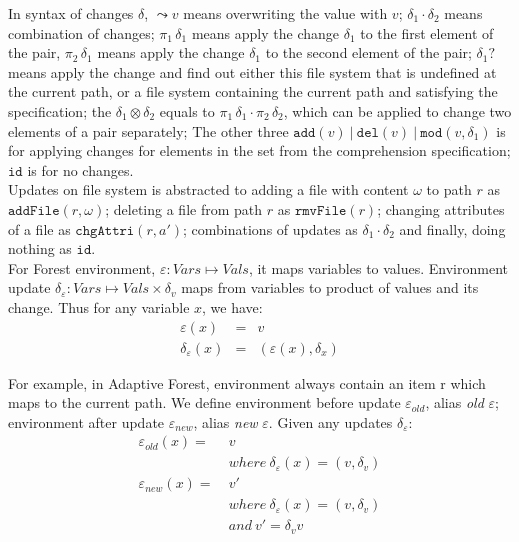 \documentclass[10pt,twoside,a4paper]{article}
\theoremstyle{theorem}
\theoremstyle{lemma}
\theoremstyle{property}
\theoremstyle{definition}
\theoremstyle{assumption}
\def\fst{\pi_1}
\def\snd{\pi_2}
\begin{document}
In syntax of changes $\delta$, $\leadsto v$ means overwriting the value with $v$; $\delta_1 \cdot \delta_2$ means combination of changes; $\fst\,\delta_1$ means apply the change $\delta_1$ to the first element of the pair, $\snd\,\delta_1$ means apply the change $\delta_1$ to the second element of the pair; $\delta_1?$ means apply the change and find out either this file system that is undefined at the current path, or a file system containing the current path and satisfying the specification; the $\delta_1 \otimes \delta_2$ equals to $\fst\,\delta_1 \cdot \snd\,\delta_2$, which can be applied to change two elements of a pair separately; The other three $\mathtt{add}(v) ~|~ \mathtt{del}(v) ~|~ \mathtt{mod}(v, \delta_1)$ is for applying changes for elements in the set from the comprehension specification; $\mathtt{id}$ is for no changes. \\

Updates on file system is abstracted to adding a file with content $\omega$ to path $r$ as $\mathtt{addFile}(r,\omega)$; deleting a file from path $r$ as $\mathtt{rmvFile}(r)$; changing attributes of a file as $\mathtt{chgAttri}(r,a')$; combinations of updates as $\delta_1 \cdot \delta_2$ and finally, doing nothing as $\mathtt{id}$.\\

For Forest environment, $\varepsilon: V\!ars \mapsto V\!als$, it maps variables to values. Environment update $\delta_\varepsilon: V\!ars \mapsto V\!als \times \delta_v$ maps from variables to product of values and its change. Thus for any variable $x$, we have:
\begin{eqnarray*}
	\varepsilon (x) &=& v\\
	\delta_\varepsilon (x) &=& (\varepsilon(x), \delta_x)
\end{eqnarray*}

For example, in Adaptive Forest, environment always contain an item r which maps to the current path. We define environment before update $\varepsilon_{old}$, alias \emph{old} $\varepsilon$; environment after update $\varepsilon_{new}$, alias \emph{new} $\varepsilon$. Given any updates $\delta_\varepsilon$:
\begin{align*}
	\varepsilon_{old}(x) =& ~v\\
						  & ~where ~\delta_\varepsilon (x) = (v, \delta_v)\\
	\varepsilon_{new}(x) =& ~v'\\
						  & ~where ~\delta_\varepsilon (x) = (v, \delta_v)\\
						  & ~and ~v' = \delta_v v
\end{align*}
\end{document}
